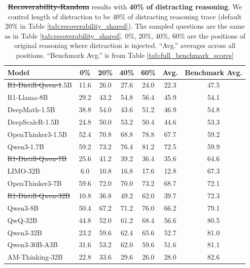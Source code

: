 \documentclass{article} %
\providecommand{\DIFaddtex}[1]{{\protect\color{blue}\uwave{#1}}} %
\providecommand{\DIFdeltex}[1]{{\protect\color{red}\sout{#1}}}                      %
\providecommand{\DIFaddFL}[1]{\DIFadd{#1}} %
\providecommand{\DIFdelFL}[1]{\DIFdel{#1}} %
\providecommand{\DIFaddbeginFL}{} %
\providecommand{\DIFaddendFL}{} %
\providecommand{\DIFdelbeginFL}{} %
\providecommand{\DIFdelendFL}{} %
\providecommand{\DIFadd}[1]{\texorpdfstring{\DIFaddtex{#1}}{#1}} %
\providecommand{\DIFdel}[1]{\texorpdfstring{\DIFdeltex{#1}}{}} %
\newcommand{\DIFscaledelfig}{0.5}
\newlength{\DIFdelgraphicswidth} %
\newlength{\DIFdelgraphicsheight} %
\newcommand{\DIFaddincludegraphics}[2][]{{\color{blue}\fbox{\DIFOincludegraphics[#1]{#2}}}} %
\newcommand{\DIFdelincludegraphics}[2][]{%
\sbox{\DIFdelgraphicsbox}{\DIFOincludegraphics[#1]{#2}}%
\settoboxwidth{\DIFdelgraphicswidth}{\DIFdelgraphicsbox} %
\settoboxtotalheight{\DIFdelgraphicsheight}{\DIFdelgraphicsbox} %
\scalebox{\DIFscaledelfig}{%
\parbox[b]{\DIFdelgraphicswidth}{\usebox{\DIFdelgraphicsbox}\\[-\baselineskip] \rule{\DIFdelgraphicswidth}{0em}}\llap{\resizebox{\DIFdelgraphicswidth}{\DIFdelgraphicsheight}{%
\setlength{\unitlength}{\DIFdelgraphicswidth}%
\begin{picture}(1,1)%
\thicklines\linethickness{2pt} %
{\color[rgb]{1,0,0}\put(0,0){\framebox(1,1){}}}%
{\color[rgb]{1,0,0}\put(0,0){\line( 1,1){1}}}%
{\color[rgb]{1,0,0}\put(0,1){\line(1,-1){1}}}%
\end{picture}%
}\hspace*{3pt}}} %
} %
\DeclareRobustCommand{\DIFaddbeginFL}{\DIFOaddbeginFL \let\includegraphics\DIFaddincludegraphics} %
\DeclareRobustCommand{\DIFaddendFL}{\DIFOaddendFL \let\includegraphics\DIFOincludegraphics} %
\DeclareRobustCommand{\DIFdelbeginFL}{\DIFOdelbeginFL \let\includegraphics\DIFdelincludegraphics} %
\DeclareRobustCommand{\DIFdelendFL}{\DIFOaddendFL \let\includegraphics\DIFOincludegraphics} %
\begin{document}
\begin{table}[ht!]
  \centering
  \begin{tabular}{lccccc|c}
    \toprule
    \textbf{Model} & \textbf{0\%} & \textbf{20\%} & \textbf{40\%} & \textbf{60\%} & \textbf{Avg.} & \textbf{Benchmark Avg.} \\
    \midrule
    \DIFdelbeginFL \DIFdelFL{R1-Distill-Qwen-1}\DIFdelendFL \DIFaddbeginFL \DIFaddFL{R1-Qwen-1}\DIFaddendFL .5B    & 11.6 & 26.0 & 27.6 & 24.0 & 22.3 & 47.5 \\
    R1-Llama-8B             & 29.2 & 43.2 & 54.8 & 56.4 & 45.9 & 54.1 \\
    DeepMath-1.5B           & 38.8 & 54.0 & 43.6 & 51.2 & 46.9 & 54.8 \\
    DeepScaleR-1.5B         & 24.8 & 50.0 & 53.2 & 50.4 & 44.6 & 53.3 \\
    OpenThinker3-1.5B       & 52.4 & 70.8 & 68.8 & 78.8 & 67.7 & 59.2 \\
    Qwen3-1.7B              & 59.2 & 73.2 & 76.4 & 81.2 & 72.5 & 59.9 \\
    \midrule
    \DIFdelbeginFL \DIFdelFL{R1-Distill-Qwen-7B      }\DIFdelendFL \DIFaddbeginFL \DIFaddFL{R1-Qwen-7B      }\DIFaddendFL & 25.6 & 41.2 & 39.2 & 36.4 & 35.6 & 64.6 \\
    LIMO-32B                & 6.0 & 10.8 & 16.8 & 17.6 & 12.8 & 67.3 \\
    OpenThinker3-7B         & 59.6 & 72.0 & 70.0 & 73.2 & 68.7 & 72.1 \\
    \DIFdelbeginFL \DIFdelFL{R1-Distill-Qwen-32B     }\DIFdelendFL \DIFaddbeginFL \DIFaddFL{R1-Qwen-32B     }\DIFaddendFL & 10.8 & 36.8 & 49.2 & 62.0 & 39.7 & 72.3 \\
    \midrule
    Qwen3-8B                & 50.4 & 67.2 & 71.2 & 76.0 & 66.2 & 79.1 \\
    QwQ-32B                 & 44.8 & 52.0 & 61.2 & 68.4 & 56.6 & 80.5 \\
    Qwen3-32B               & 23.2 & 59.6 & 62.4 & 65.6 & 52.7 & 81.0 \\
    Qwen3-30B-A3B           & 31.6 & 53.2 & 62.0 & 59.6 & 51.6 & 81.1 \\
    AM-Thinking-32B      & 22.8 & 33.6 & 29.6 & 26.0 & 28.0 & 82.6 \\
    \bottomrule
  \end{tabular}
  \caption{\DIFdelbeginFL \textbf{\DIFdelFL{Recoverability-Random}} %
\DIFdelendFL \DIFaddbeginFL \textbf{\DIFaddFL{Recoverability (individual)}} \DIFaddendFL results with \textbf{40\% of distracting reasoning}. We control length of distraction to be 40\% of distracting reasoning trace (default 20\% in Table \ref{tab:recoverability_shared}). The sampled questions are the same as in Table \ref{tab:recoverability_shared}. 0\%, 20\%, 40\%, 60\% are the positions of original reasoning where distraction is injected. ``Avg.'' averages across all positions. ``Benchmark Avg.'' is from Table \ref{tab:full_benchmark_scores}}
  \label{tab:recoverability_individial_40percent}
\end{table}
\end{document}
